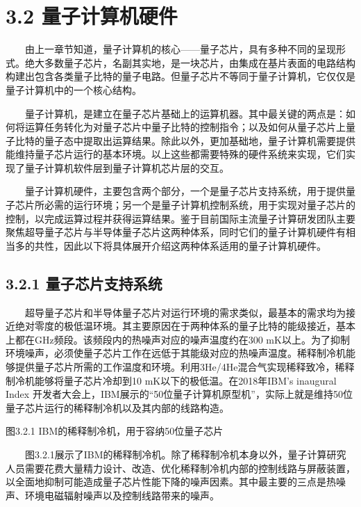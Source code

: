 \documentclass[a4paper,11pt,english]{sphinxmanual}
\begin{document}
\sphinxstepscope


\section{3.2 量子计算机硬件}
\label{\detokenize{rst/3.2_u91cf_u5b50_u8ba1_u7b97_u786c_u4ef6:id1}}\label{\detokenize{rst/3.2_u91cf_u5b50_u8ba1_u7b97_u786c_u4ef6::doc}}
\sphinxAtStartPar
  由上一章节知道，量子计算机的核心——量子芯片，具有多种不同的呈现形式。绝大多数量子芯片，名副其实地，是一块芯片，由集成在基片表面的电路结构构建出包含各类量子比特的量子电路。但量子芯片不等同于量子计算机，它仅仅是量子计算机中的一个核心结构。

\sphinxAtStartPar
  量子计算机，是建立在量子芯片基础上的运算机器。其中最关键的两点是：如何将运算任务转化为对量子芯片中量子比特的控制指令；以及如何从量子芯片上量子比特的量子态中提取出运算结果。除此以外，更加基础地，量子计算机需要提供能维持量子芯片运行的基本环境。以上这些都需要特殊的硬件系统来实现，它们实现了量子计算机软件层到量子计算机芯片层的交互。

\sphinxAtStartPar
  量子计算机硬件，主要包含两个部分，一个是量子芯片支持系统，用于提供量子芯片所必需的运行环境；另一个是量子计算机控制系统，用于实现对量子芯片的控制，以完成运算过程并获得运算结果。鉴于目前国际主流量子计算研发团队主要聚焦超导量子芯片与半导体量子芯片这两种体系，同时它们的量子计算机硬件有相当多的共性，因此以下将具体展开介绍这两种体系适用的量子计算机硬件。


\subsection{3.2.1 量子芯片支持系统}
\label{\detokenize{rst/3.2_u91cf_u5b50_u8ba1_u7b97_u786c_u4ef6:id2}}
\sphinxAtStartPar
  超导量子芯片和半导体量子芯片对运行环境的需求类似，最基本的需求均为接近绝对零度的极低温环境。其主要原因在于两种体系的量子比特的能级接近，基本上都在GHz频段。该频段内的热噪声对应的噪声温度约在300 mK以上。为了抑制环境噪声，必须使量子芯片工作在远低于其能级对应的热噪声温度。稀释制冷机能够提供量子芯片所需的工作温度和环境。利用3He/4He混合气实现稀释致冷，稀释制冷机能够将量子芯片冷却到10 mK以下的极低温。在2018年IBM’s inaugural Index 开发者大会上，IBM展示的“50位量子计算机原型机”，实际上就是维持50位量子芯片运行的稀释制冷机以及其内部的线路构造。


\begin{center}图3.2.1 IBM的稀释制冷机，用于容纳50位量子芯片
\end{center}
\sphinxAtStartPar
  图3.2.1展示了IBM的稀释制冷机。除了稀释制冷机本身以外，量子计算研究人员需要花费大量精力设计、改造、优化稀释制冷机内部的控制线路与屏蔽装置，以全面地抑制可能造成量子芯片性能下降的噪声因素。其中最主要的三点是热噪声、环境电磁辐射噪声以及控制线路带来的噪声。
\end{document}

